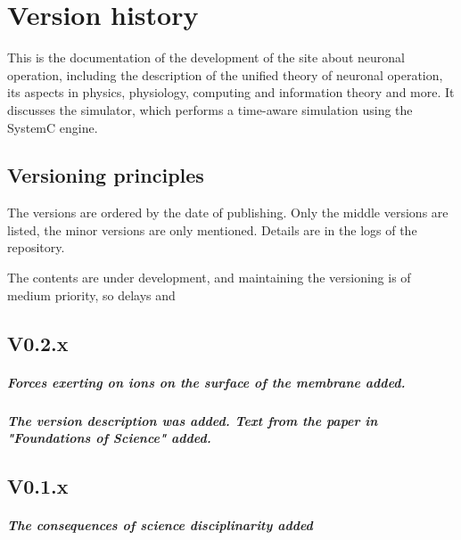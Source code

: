 
\iflatexml
\else
\minitoc
\fi

\chapter*{Version history\label{ch:Version}}

This is the documentation of the development of the site
about neuronal operation,
including the description of the unified theory of 
neuronal operation, its aspects in physics, physiology, computing and information theory and more.
It discusses the simulator, which performs a time-aware simulation
using the SystemC engine.
	
\section*{\label{sec:Versioning-Main} Versioning principles}

The versions are ordered by the date of publishing.
Only the middle versions are listed, the minor versions are 
only mentioned. Details are in the logs of the repository.

The contents are under development, and maintaining the
versioning is of medium priority, so delays and 

\section*{V0.2.x\label{sec:Version-0.2.x}}
\paragraph [Version 0.2.1 @ 2026.02.23] 
{Forces exerting on ions on the surface of the membrane added.}

\paragraph [Version 0.2.0 @ 2026.02.11] 
{The version description was added.
Text from the paper in "Foundations of Science" added.}


\section*{V0.1.x\label{sec:Version-0.1.x}}
\paragraph [Version 0.1.18 @ 2026.02.01] 
{The consequences of science disciplinarity added}

